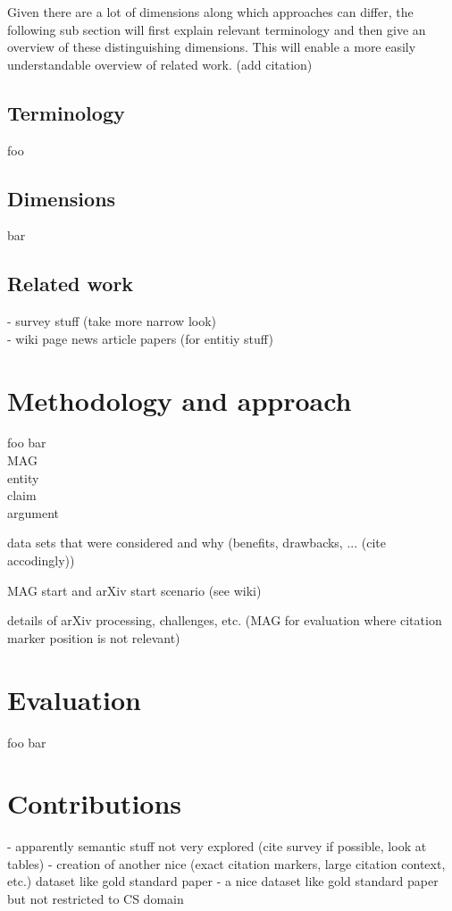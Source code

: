 \documentclass{proseminar}
\begin{document}
Given there are a lot of dimensions along which approaches can differ, the following sub section will first explain relevant terminology and then give an overview of these distinguishing dimensions. This will enable a more easily understandable overview of related work. (add citation)

\subsection{Terminology}
foo

\subsection{Dimensions}
bar

\subsection{Related work}
- survey stuff (take more narrow look)\\
- wiki page news article papers (for entitiy stuff)

\section{Methodology and approach}
foo bar\\
MAG\cite{Paszcza2016}\cite{Herrmannova2016}\cite{Hug2017}\cite{Sinha2015}\\
entity\cite{Mishra2016}\\
claim\cite{Levy2014}\\
argument\cite{Goudas2014}

data sets that were considered and why (benefits, drawbacks, ... (cite accodingly))

MAG start and arXiv start scenario (see wiki)

details of arXiv processing, challenges, etc. (MAG for evaluation where citation marker position is not relevant)

\section{Evaluation}
foo bar

\section{Contributions}
- apparently semantic stuff not very explored (cite survey if possible, look at tables)  
- creation of another nice (exact citation markers, large citation context, etc.) dataset like gold standard paper\cite{Faerber2018}  
- a nice dataset like gold standard paper\cite{Faerber2018} but not restricted to CS domain
\end{document}
